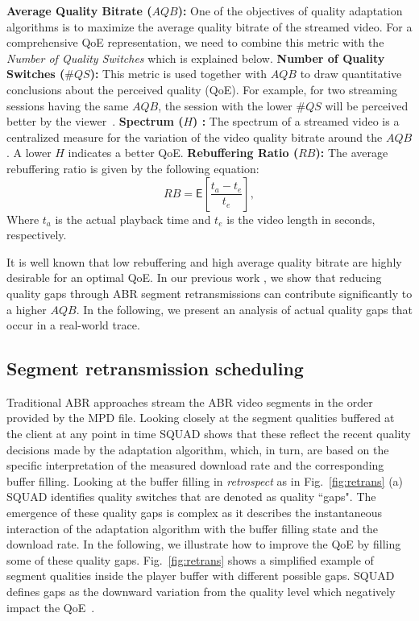 \hfill \break
{\bf Average Quality Bitrate ($AQB$):} One of the objectives of quality adaptation algorithms is to maximize the average quality bitrate of the streamed video. For a comprehensive QoE representation, we need to combine this metric with the {\it Number of Quality Switches} which is explained below.
\hfill \break
{\bf Number of Quality Switches ($\#QS$):} This metric is used together with $AQB$ to draw quantitative conclusions about the perceived quality (QoE). For example, for two streaming sessions having the same $AQB$, the session with the lower $\#QS$ will be perceived better by the viewer~\cite{ZinkSpectrum2005}.
\hfill \break
{\bf Spectrum ($H$) \cite{ZinkSpectrum2005}:} The spectrum of a streamed video is a centralized measure for the variation of the video quality bitrate around the $AQB$. A lower $H$ indicates a better QoE.
\hfill \break
{\bf Rebuffering Ratio ($RB$):} The average rebuffering ratio is given by the following equation:
\begin{equation}
\label{eq:rebuffer_ratio}
    RB = \mathsf{E}\left[\frac{t_a - t_e}{t_e}\right],
\end{equation}
Where $t_a$ is the actual playback time and $t_e$ is the video length in seconds, respectively.

It is well known that low rebuffering and high average quality bitrate are highly desirable for an optimal QoE. In our previous work \cite{Wang:TOMM:2017}, we show that reducing quality gaps through ABR segment retransmissions can contribute significantly to a higher $AQB$. In the following, we present an analysis of actual quality gaps that occur in a real-world trace.
\subsection{Segment retransmission scheduling}
\label{subsec:retrans_sched}

Traditional ABR approaches stream the ABR video segments in the order provided by the MPD file. Looking closely at the segment qualities buffered at the client at any point in time SQUAD shows that these reflect the recent quality decisions made by the adaptation algorithm, which, in turn, are based on the specific interpretation of the measured download rate and the corresponding buffer filling. Looking at the buffer filling in \emph{retrospect} as in Fig.~\ref{fig:retrans} (a) SQUAD identifies quality switches that are denoted as quality ``gaps". The emergence of these quality gaps is complex as it describes the instantaneous interaction of the adaptation algorithm with the buffer filling state and the download rate. In the following, we illustrate how to improve the QoE by filling some of these quality gaps. Fig.~\ref{fig:retrans} shows a simplified example of segment qualities inside the player buffer with different possible gaps. SQUAD defines gaps as the downward variation from the quality level which negatively impact the QoE~\cite{ZinkSpectrum2005}.

